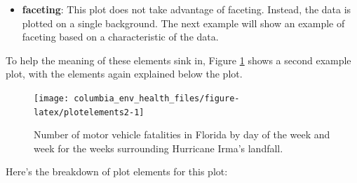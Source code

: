 \documentclass[]{tufte-book}
\begin{document}
\begin{itemize}
{    font, margins, and axis ticks.}
  This plot uses the default \texttt{theme\_gray} theme, with a gray background
  to the main plot area, white gridlines, a Sans Serif font family,
  and a base font size of 11.
  The one customization is that the legend (which here provides the key for
  how color maps to
  day of the week) is shown on the bottom of the plot rather than to the right of
  the plot.
\item
  \textbf{faceting}: This plot does not take advantage of faceting. Instead, the data
  is plotted on a single background. The next example will show an example
  of faceting based on a characteristic of the data.
\end{itemize}

To help the meaning of these elements sink in, Figure \ref{fig:plotelements2}
shows a second example plot, with
the elements again explained below the plot.

\begin{figure}
\texttt{[image: columbia\_env\_health\_files/figure-latex/plotelements2-1]} \caption[Number of motor vehicle fatalities in Florida by day of the week and week for the weeks surrounding Hurricane Irma's landfall]{Number of motor vehicle fatalities in Florida by day of the week and week for the weeks surrounding Hurricane Irma's landfall.}\label{fig:plotelements2}
\end{figure}

Here's the breakdown of plot elements for this plot:
\end{document}
